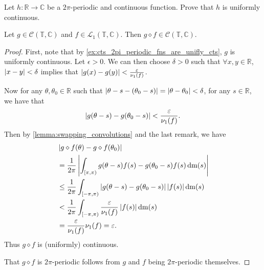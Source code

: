 \documentclass[notoc,notitlepage]{tufte-book}
\DeclareMathOperator{\dm}{dm}
\begin{document}
\begin{ex}\label{ex:cts_2pi_periodic_fns_are_unifly_cts}
  Let $h : \mathbb{R} \to \mathbb{C}$ be a $2 \pi$-periodic
  and continuous function.
  Prove that $h$ is uniformly continuous.
\end{ex}

\begin{propo}\label{propo:continuity_of_the_convolution_of_f_and_g_where_g_is_continuous}
  Let $g \in \mathcal{C}(\mathbb{T}, \mathbb{C})$ and
  $f \in \mathcal{L}_1(\mathbb{T}, \mathbb{C})$.
  Then $g \diamond f \in \mathcal{C}(\mathbb{T}, \mathbb{C})$.
\end{propo}

\begin{proof}
  First, note that by \cref{ex:cts_2pi_periodic_fns_are_unifly_cts},
  $g$ is uniformly continuous.
  Let $\epsilon > 0$.
  We can then choose $\delta > 0$ such that $\forall x, y \in \mathbb{R}$,
  $\left|x - y\right| < \delta$ implies that $\left|g(x) - g(y)\right| <
  \frac{\varepsilon}{\nu_1(f)}$.

  Now for any $\theta, \theta_0 \in \mathbb{R}$ such that
  $\left|\theta - s - (\theta_0 - s)\right| = \left|\theta - \theta_0\right| < \delta$,
  for any $s \in \mathbb{R}$, we have that
  \begin{equation*}
    \left| g(\theta - s) - g(\theta_0 - s) \right| < \frac{\varepsilon}{\nu_1(f)}.
  \end{equation*}
  Then by \cref{lemma:swapping_convolutions} and the last remark, we have
  \begin{align*}
    &\abs{g \diamond f(\theta) - g \diamond f(\theta_0)} \\
    &= \frac{1}{2\pi} \abs{ \int_{[\pi, \pi)} g(\theta - s)f(s)
      - g(\theta_0 - s)f(s) \dm(s) } \\
    &\leq \frac{1}{2\pi} \int_{[-\pi, \pi)}
      \abs{g(\theta - s) - g(\theta_0 - s)} \abs{f(s)} \dm(s) \\
    &< \frac{1}{2\pi} \int_{[-\pi, \pi)} \frac{\epsilon}{\nu_1(f)} \abs{f(s)} \dm(s) \\
    &= \frac{\epsilon}{\nu_1(f)} \nu_1(f) = \epsilon.
  \end{align*}
  Thus $g \diamond f$ is (uniformly) continuous.

  That $g \diamond f$ is $2 \pi$-periodic follows from $g$ and $f$
  being $2 \pi$-periodic themselves.
\end{proof}
\end{document}
